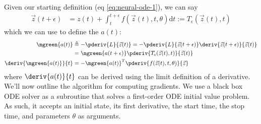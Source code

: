 \documentclass[11pt]{article}
\begin{document}
Given our starting definition (eq \ref{eq:neural-ode-1}), we can say
\begin{align}
	\vec z (t + \epsilon) 
		&= z(t) + \int_t^{t + \epsilon} f\left(\vec{z}\left(t \right), t, \theta	 \right) \mathrm{d}t 
		:= T_\epsilon (\vec z (t), t)  
\end{align}
which we can use to define the  $a(t)$:
\begin{align}
	\mgreen{a(t)}
		&\triangleq - \pderiv{L}{\vec z (t)} = -  \pderiv{L}{\vec z (t + \epsilon)} \deriv{\vec z (t + \epsilon)}{\vec z (t)} \\
		&= \mgreen{a(t + \epsilon)} \pderiv{T_\epsilon (\vec z (t), t)}{\vec z (t)} \\
	\deriv{\mgreen{a(t)}}{t}
		&= - \mgreen{a(t)}^T \pderiv{ f(\vec z (t), t, \theta) }{\vec z}
\end{align}
where $\deriv{a(t)}{t}$ can be derived using the limit definition of a derivative. We'll now outline the algorithm for computing gradients. We use a black box ODE solver as a subroutine that solves a first-order ODE initial value problem. As such, it accepts an initial state, its first derivative, the start time, the stop time, and parameters $\theta$ as arguments. 
\end{document}
